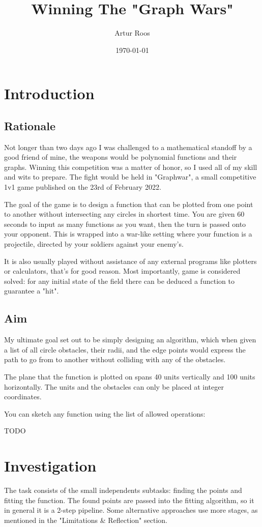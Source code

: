 \documentclass[12pt, titlepage]{article}
\title{Winning The "Graph Wars"}
\author{Artur Roos}
\date{\today}
\newcommand{\TODO}{\begin{center}\color{red}TODO\end{center}}
\begin{document}
\maketitle
\tableofcontents

\section{Introduction}
\subsection{Rationale}
Not longer than two days ago I was challenged to a mathematical standoff by a 
good friend of mine, the weapons would be polynomial functions and their 
graphs. Winning this competition was a matter of honor, so I used all of my 
skill and wits to prepare. The fight would be held in \mbox{"Graphwar"}, a 
small competitive 1v1 game published on the 23rd of February 2022. 

The goal of the game is to design a function that can be plotted from one point
to another without intersecting any circles in shortest time. You are given 
60 seconds to input as many functions as you want, then the turn is passed onto
your opponent.
This is wrapped into a war-like setting where your function is a projectile, 
directed by your soldiers against your enemy's.

It is also usually played without assistance of any external programs like 
plotters or calculators, that's for good reason. Most importantly, game is
considered solved: for any initial state of the field there can be deduced a 
function to guarantee a "hit". 

\subsection{Aim}
My ultimate goal set out to be simply designing an algorithm, which when given
a list of all circle obstacles, their radii, and the edge points would express
the path to go from to another without colliding with any of the obstacles. 

The plane that the function is plotted on spans 40 units vertically and 
100 units horizontally. The units and the obstacles can only be placed at 
integer coordinates. 

You can sketch any function using the list of allowed 
operations:
\TODO


\section{Investigation}
The task consists of the small independents subtasks: finding the points and 
fitting the function. The found points are passed into the fitting algorithm,
so it in general it is a 2-step pipeline. Some alternative approaches use
more stages, as mentioned in the "Limitations \& Reflection" section. 
\end{document}
